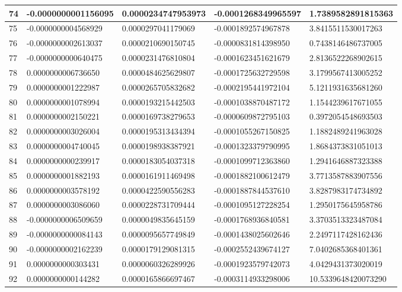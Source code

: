 \begin{center}
\begin{longtable}{|p{0.5cm}|p{3.5cm}|p{3.5cm}|p{3.5cm}|p{3.5cm}|}
\hline
74  & -0.0000000001156095  & 0.0000234747953973  & -0.0001268349965597  & 1.7389582891815363\\
\hline
75  & -0.0000000004568929  & 0.0000297041179069  & -0.0001892574967878  & 3.8415511530017263\\
\hline
76  & -0.0000000002613037  & 0.0000210690150745  & -0.0000831814398950  & 0.7438146486737005\\
\hline
77  & -0.0000000000640475  & 0.0000231476810804  & -0.0001623451621679  & 2.8136522268902615\\
\hline
78  & 0.0000000006736650  & 0.0000484625629807  & -0.0001725632729598  & 3.1799567413005252\\
\hline
79  & 0.0000000001222987  & 0.0000265705832682  & -0.0002195441972104  & 5.1211931635681260\\
\hline
80  & 0.0000000001078994  & 0.0000193215442503  & -0.0001038870487172  & 1.1544239617671055\\
\hline
81  & 0.0000000002150221  & 0.0000169738279653  & -0.0000609872795103  & 0.3972054548693503\\
\hline
82  & 0.0000000003026004  & 0.0000195313434394  & -0.0001055267150825  & 1.1882489241963028\\
\hline
83  & 0.0000000004740045  & 0.0000198938387921  & -0.0001323379790995  & 1.8684373831051013\\
\hline
84  & 0.0000000000239917  & 0.0000183054037318  & -0.0001099712363860  & 1.2941646887323388\\
\hline
85  & 0.0000000001882193  & 0.0000161911469498  & -0.0001882100612479  & 3.7713587883907556\\
\hline
86  & 0.0000000003578192  & 0.0000422590556283  & -0.0001887844537610  & 3.8287983174734892\\
\hline
87  & 0.0000000003086060  & 0.0000228731709444  & -0.0001095127228254  & 1.2950175645958786\\
\hline
88  & -0.0000000006509659  & 0.0000049835645159  & -0.0001768936840581  & 3.3703513323487084\\
\hline
89  & -0.0000000000084143  & 0.0000095657749849  & -0.0001438025602646  & 2.2497117428162436\\
\hline
90  & -0.0000000002162239  & 0.0000179129081315  & -0.0002552439674127  & 7.0402685368401361\\
\hline
91  & 0.0000000000303431  & 0.0000060326289926  & -0.0001923579742073  & 4.0429431373020019\\
\hline
92  & 0.0000000000144282  & 0.0000165866697467  & -0.0003114933298006  & 10.5339648420073290\\

\end{longtable}
\end{center}
